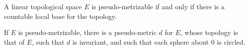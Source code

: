 A linear topological space $E$ is pseudo-metrizable if and only if there is a countable local base for the topology.

If $E$ is pseudo-metrizable, there is a pseudo-metric $d$ for $E$, whose topology is that of $E$, such that $d$ is invariant, and such that each sphere about $0$ is circled.
